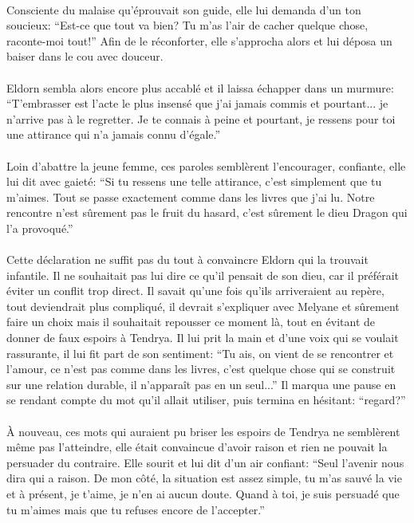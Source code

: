 \paragraph{}
Consciente du malaise qu'éprouvait son guide, elle lui demanda d'un ton
soucieux: ``Est-ce que tout va bien? Tu m'as l'air de cacher quelque chose,
raconte-moi tout!'' Afin de le réconforter, elle s'approcha alors et lui déposa
un baiser dans le cou avec douceur.

\paragraph{}
Eldorn sembla alors encore plus accablé et il laissa échapper dans un murmure:
``T'embrasser est l'acte le plus insensé que j'ai jamais commis et pourtant...
je n'arrive pas à le regretter. Je te connais à peine et pourtant, je ressens
pour toi une attirance qui n'a jamais connu d'égale.''

\paragraph{}
Loin d'abattre la jeune femme, ces paroles semblèrent l'encourager, confiante,
elle lui dit avec gaieté: ``Si tu ressens une telle attirance, c'est simplement
que tu m'aimes. Tout se passe exactement comme dans les livres que j'ai lu.
Notre rencontre n'est sûrement pas le fruit du hasard, c'est sûrement le dieu
Dragon qui l'a provoqué.''

\paragraph{}
Cette déclaration ne suffit pas du tout à convaincre Eldorn qui la trouvait
infantile. Il ne souhaitait pas lui dire ce qu'il pensait de son dieu, car il
préférait éviter un conflit trop direct. Il savait qu'une fois qu'ils
arriveraient au repère, tout deviendrait plus compliqué, il devrait s'expliquer
avec Melyane et sûrement faire un choix  mais il souhaitait repousser ce moment
là, tout en évitant de donner de faux espoirs à Tendrya. Il lui prit la main et
d'une voix qui se voulait rassurante, il lui fit part de son sentiment: ``Tu
ais, on vient de se rencontrer et l'amour, ce n'est pas comme dans les livres,
c'est quelque chose qui se construit sur une relation durable, il n'apparaît pas
en un seul...'' Il marqua une pause en se rendant compte du mot qu'il allait
utiliser, puis termina en hésitant: ``regard?''

\paragraph{}
À nouveau, ces mots qui auraient pu briser les espoirs de Tendrya ne semblèrent
même pas l'atteindre, elle était convaincue d'avoir raison et rien ne pouvait la
persuader du contraire. Elle sourit et lui dit d'un air confiant: ``Seul
l'avenir nous dira qui a raison. De mon côté, la situation est assez simple, tu
m'as sauvé la vie et à présent, je t'aime, je n'en ai aucun doute. Quand à toi,
je suis persuadé que tu m'aimes mais que tu refuses encore de l'accepter.''
